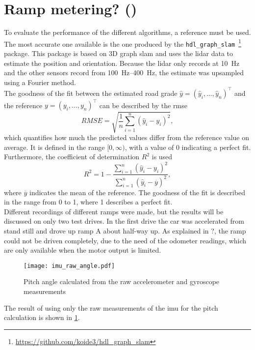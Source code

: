 \section{Ramp metering? ()}
To evaluate the performance of the different algorithms, a reference must be used.
The most accurate one available is the one produced by the \texttt{hdl\_graph\_slam}~\footnote{\url{https://github.com/koide3/hdl_graph_slam}} package.
This package is based on 3D graph slam and uses the \gls{lidar} data to estimate the position and orientation.
Because the \gls{lidar} only records at \SI{10}{\hertz} and the other sensors record from \SIrange{100}{400}{\hertz}, the estimate was upsampled using a Fourier method.\\
The goodness of the fit between the estimated road grade $\hat{y} = (\hat{y}_i, \dots, \hat{y}_n)^\intercal$ and the reference $y = (y_i, \dots, y_n)^\intercal$ can be described by the \gls{rmse}
\begin{equation}
	RMSE = \sqrt{\frac{1}{n}\sum_{i = 1}^n(\hat{y}_i - y_i)^2},
\end{equation}
which quantifies how much the predicted values differ from the reference value on average.
It is defined in the range $[0, \infty)$, with a value of 0 indicating a perfect fit.
Furthermore, the coefficient of determination $R^2$ is used
\begin{equation}
	R^2 = 1 - \frac{\sum\limits_{i = 1}^n(\hat{y}_i - y_i)^2}{\sum\limits_{i = 1}^n(\hat{y}_i - \overline{y})^2},
\end{equation}
where $\overline{y}$ indicates the mean of the reference.
The goodness of the fit is described in the range from 0 to 1, where 1 describes a perfect fit.\\
Different recordings of different ramps were made, but the results will be discussed on only two test drives.
In the first drive the car was accelerated from stand still and drove up ramp A  about half-way up.
As explained in ?, the ramp could not be driven completely, due to the need of the odometer readings, which are only available when the motor output is limited.
\begin{figure}[htbp]
	\centering
	\texttt{[image: imu\_raw\_angle.pdf]}
	\caption[Raw]{Pitch angle calculated from the raw accelerometer and gyroscope measurements}
	\label{fig:imu_raw_angle}
\end{figure}
The result of using only the raw measurements of the \gls{imu} for the pitch calculation is shown in \cref{fig:imu_raw_angle}.
